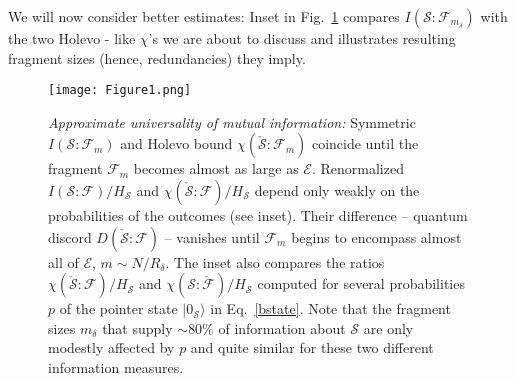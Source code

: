 \documentclass[aps,prl,showpacs,amsmath,amssymb,amsfonts,lengthcheck,twocolumn,longbibliography,superscriptaddress]{revtex4-2}
\newcommand{\ket}[1]    {| #1 \rangle}
\newcommand{\cS}        {{\mathcal S}}
\newcommand{\cE}        {{\mathcal E}}
\newcommand{\+}         {\dagger}
\newcommand\cF{{\mathcal F}}
\newcommand{\mc}[1]{\mathcal{#1}}
\begin{document}
We will now consider better estimates: Inset in Fig.~\ref{fig:mutI} compares $I(\cS : \cF_{m_\delta}) $ with the two Holevo - like $\chi$'s we are about to discuss and illustrates resulting fragment sizes (hence, redundancies) they imply.



\begin{figure}
	\texttt{[image: Figure1.png]}
	\caption{\label{fig:mutI}{\it Approximate universality of mutual information:} Symmetric $I(\cS : \cF_m)$ and Holevo bound $\chi(\check \cS : \cF_m)$ coincide until the fragment $\cF_m$ becomes almost as large as $\cE$. Renormalized $I(\cS : \cF)/H_\cS$ and $\chi(\check \cS : \cF)/H_\cS$ depend only weakly on the probabilities of the outcomes (see inset). Their difference -- quantum discord $D(\check \cS : \cF)$ -- vanishes until $\cF_m$ begins to encompass almost all of $\cE$, $m \sim N/R_\delta$. The inset also compares the ratios $\chi(\check \cS : \cF)/H_\cS$ and $\chi( \cS : \check \cF)/H_\cS$ computed for several probabilities $p$ of the pointer state $\ket {0_\cS}$ in Eq.~\eqref{bstate}. Note that the fragment sizes $m_\delta$ that supply $\sim$80\% of information about $\cS$ are only modestly affected by $p$ and quite similar for these two different information measures.} 
\end{figure}
\end{document}
